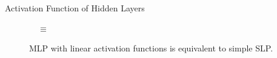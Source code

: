 \begin{frame}{Activation Function of Hidden Layers}
\begin{figure}[H]
        $\quad\equiv\quad$
        \begin{subfigure}[b]{0.15\textwidth}
            \centering
        \end{subfigure}
        \caption{MLP with linear activation functions is equivalent to simple SLP.}
    \end{figure}
\end{frame}

